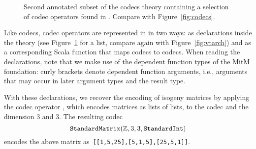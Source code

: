 \begin{figure}[ht]\centering
  \caption[List of Codec Operators]{
    Second annotated subset of the codecs theory containing a selection of codec operators found in \mmt. 
    Compare with Figure~\ref{fig:codecs}. 
  }
  \label{fig:codecops}
\end{figure}
Like codecs, codec operators are represented in \mmt in two ways: as declarations inside the theory  (see Figure~\ref{fig:codecops} for a list, compare again with Figure~\ref{fig:vtarch}) and as a corresponding Scala function that maps codecs to codecs. 
When reading the declarations, note that we make use of the dependent function types of the MitM foundation: curly brackets denote dependent function arguments, i.e., arguments that may occur in later argument types and the result type.

With these declarations, we recover the \lmfdb encoding of isogeny matrices by applying the codec operator , which encodes matrices as lists of lists, to the codec  and the dimension $3$ and $3$.
The resulting codec \[\plaintt{StandardMatrix}(\mathbb{Z}, 3, 3, \plaintt{StandardInt})\] encodes the above matrix as\ \lstinline|[[1,5,25],[5,1,5],[25,5,1]]|.
